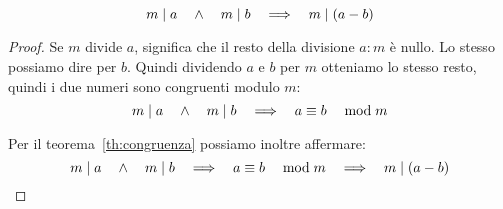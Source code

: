 \begin{mdframed}
    \begin{teorema}
        \label{th:divisore_della_differenza}
        \begin{equation}
            m  \mid  a \quad\land\quad m  \mid  b  \quad\Longrightarrow\quad  m  \mid  (a - b)
        \end{equation}
    \end{teorema}
    \begin{proof}
        Se $m$ divide $a$, significa che il resto della divisione $a : m$ è nullo. Lo stesso possiamo dire per $b$. Quindi dividendo $a$ e $b$ per $m$ otteniamo lo stesso resto, quindi i due numeri sono congruenti modulo $m$:
        \begin{equation}
            m  \mid  a \quad\land\quad m  \mid  b  \quad\Longrightarrow\quad   a \equiv b \quad\bmod m 
        \end{equation}

        Per il teorema~\ref{th:congruenza} possiamo inoltre affermare:
        \begin{equation}
            m  \mid  a \quad\land\quad m  \mid  b  \quad\Longrightarrow\quad   a \equiv b \quad\bmod m   \quad\Longrightarrow\quad  m  \mid  (a-b)
        \end{equation}
    \end{proof}
\end{mdframed}

